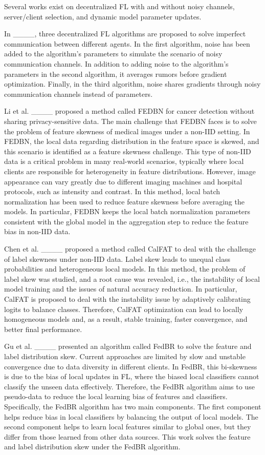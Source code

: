 Several works exist on decentralized FL with and without noisy channels, server/client selection, and dynamic model parameter updates. 

In ____, three decentralized FL algorithms are proposed to solve imperfect communication between different agents. In the first algorithm, noise has been added to the algorithm's parameters to simulate the scenario of noisy communication channels. In addition to adding noise to the algorithm's parameters in the second algorithm, it averages rumors before gradient optimization. Finally, in the third algorithm, noise shares gradients through noisy communication channels instead of parameters. 

Li et al. ____ proposed a method called FEDBN for cancer detection without sharing privacy-sensitive data. The main challenge that FEDBN faces is to solve the problem of feature skewness of medical images under a non-IID setting. In FEDBN, the local data regarding distribution in the feature space is skewed, and this scenario is identified as a feature skewness challenge. This type of non-IID data is a critical problem in many real-world scenarios, typically where local clients are responsible for heterogeneity in feature distributions. However, image appearance can vary greatly due to different imaging machines and hospital protocols, such as intensity and contrast. In this method, local batch normalization has been used to reduce feature skewness before averaging the models. In particular, FEDBN keeps the local batch normalization parameters consistent with the global model in the aggregation step to reduce the feature bias in non-IID data.

Chen et al. ____ proposed a method called CalFAT to deal with the challenge of label skewness under non-IID data. Label skew leads to unequal class probabilities and heterogeneous local models. In this method, the problem of label skew was studied, and a root cause was revealed, i.e., the instability of local model training and the issues of natural accuracy reduction. In particular, CalFAT is proposed to deal with the instability issue by adaptively calibrating logits to balance classes. Therefore, CalFAT optimization can lead to locally homogeneous models and, as a result, stable training, faster convergence, and better final performance.

Gu et al. ____ presented an algorithm called FedBR to solve the feature and label distribution skew. Current approaches are limited by slow and unstable convergence due to data diversity in different clients. In FedBR, this bi-skewness is due to the bias of local updates in FL, where the biased local classifiers cannot classify the unseen data effectively. Therefore, the FedBR algorithm aims to use pseudo-data to reduce the local learning bias of features and classifiers. Specifically, the FedBR algorithm has two main components. The first component helps reduce bias in local classifiers by balancing the output of local models. The second component helps to learn local features similar to global ones, but they differ from those learned from other data sources. This work solves the feature and label distribution skew under the FedBR algorithm.

